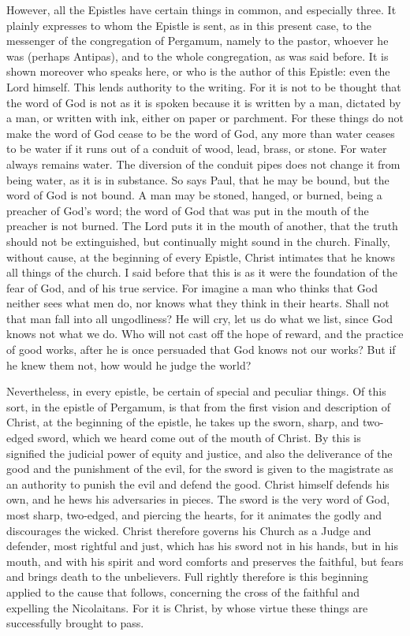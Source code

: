 However, all the Epistles have certain things in common, and especially three. It plainly expresses to whom the Epistle is sent, as in this present case, to the messenger of the congregation of Pergamum, namely to the pastor, whoever he was (perhaps Antipas), and to the whole congregation, as was said before. It is shown moreover who speaks here, or who is the author of this Epistle: even the Lord himself. This lends authority to the writing. For it is not to be thought that the word of God is not as it is spoken because it is written by a man, dictated by a man, or written with ink, either on paper or parchment. For these things do not make the word of God cease to be the word of God, any more than water ceases to be water if it runs out of a conduit of wood, lead, brass, or stone. For water always remains water. The diversion of the conduit pipes does not change it from being water, as it is in substance. So says Paul, that he may be bound, but the word of God is not bound. A man may be stoned, hanged, or burned, being a preacher of God’s word; the word of God that was put in the mouth of the preacher is not burned. The Lord puts it in the mouth of another, that the truth should not be extinguished, but continually might sound in the church. Finally, without cause, at the beginning of every Epistle, Christ intimates that he knows all things of the church. I said before that this is as it were the foundation of the fear of God, and of his true service. For imagine a man who thinks that God neither sees what men do, nor knows what they think in their hearts. Shall not that man fall into all ungodliness? He will cry, let us do what we list, since God knows not what we do. Who will not cast off the hope of reward, and the practice of good works, after he is once persuaded that God knows not our works? But if he knew them not, how would he judge the world?

Nevertheless, in every epistle, be certain of special and peculiar things. Of this sort, in the epistle of Pergamum, is that from the first vision and description of Christ, at the beginning of the epistle, he takes up the sworn, sharp, and two-edged sword, which we heard come out of the mouth of Christ. By this is signified the judicial power of equity and justice, and also the deliverance of the good and the punishment of the evil, for the sword is given to the magistrate as an authority to punish the evil and defend the good. Christ himself defends his own, and he hews his adversaries in pieces. The sword is the very word of God, most sharp, two-edged, and piercing the hearts, for it animates the godly and discourages the wicked. Christ therefore governs his Church as a Judge and defender, most rightful and just, which has his sword not in his hands, but in his mouth, and with his spirit and word comforts and preserves the faithful, but fears and brings death to the unbelievers. Full rightly therefore is this beginning applied to the cause that follows, concerning the cross of the faithful and expelling the Nicolaitans. For it is Christ, by whose virtue these things are successfully brought to pass.

